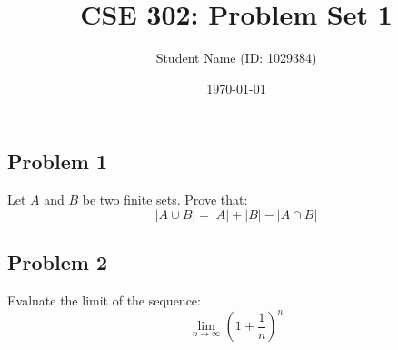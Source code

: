 \documentclass[11pt,a4paper]{article}
\title{\bfseries CSE 302: Problem Set 1}
\author{Student Name (ID: 1029384)}
\date{\today}
\begin{document}
\maketitle

\subsection*{Problem 1}
Let $A$ and $B$ be two finite sets. Prove that:
\begin{equation*}
    |A \cup B| = |A| + |B| - |A \cap B|
\end{equation*}

\subsection*{Problem 2}
Evaluate the limit of the sequence:
\begin{equation*}
    \lim_{n \to \infty} \left(1 + \frac{1}{n}\right)^n
\end{equation*}
\end{document}
